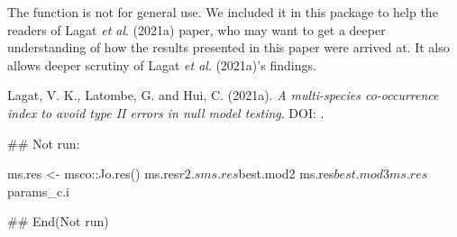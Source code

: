 \documentclass[a4paper]{book}
\begin{document}
%
\begin{Note}\relax
The function  is not for general use. We included it in this package to help
the readers of Lagat \emph{et al}. (2021a) paper, who may want to get a deeper understanding of how the results
presented in this paper were arrived at. It also allows deeper scrutiny of Lagat \emph{et al}. (2021a)'s
findings.
\end{Note}
%
\begin{References}\relax
Lagat, V. K., Latombe, G. and Hui, C. (2021a). \emph{A multi-species co-occurrence
index to avoid type II errors in null model testing}. DOI: .
\end{References}
%
\begin{Examples}
\begin{ExampleCode}
## Not run: 

ms.res <- msco::Jo.res()
ms.res$r2.s
ms.res$best.mod2
ms.res$best.mod3
ms.res$params_c.i

## End(Not run)
\end{ExampleCode}
\end{Examples}
%
\end{document}
